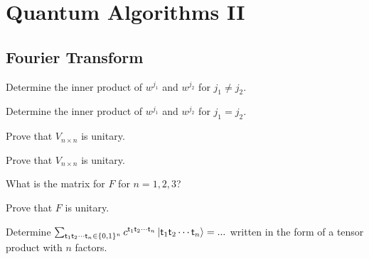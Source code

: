 
\chapter{Quantum Algorithms II}


\section{Fourier Transform}





\begin{example}
Determine the inner product of $w^{j_1}$ and $w^{j_2}$ for $j_1 \neq j_2$. 
\end{example}

\begin{example}
Determine the inner product of $w^{j_1}$ and $w^{j_2}$ for $j_1 = j_2$. 
\end{example}


\begin{example}
Prove that $V_{n \times n}$ is unitary.
\end{example}


\begin{example}
Prove that $V_{n \times n}$ is unitary.
\end{example}



\begin{example}
What is the matrix for $F$ for $n = 1,2,3$?
\end{example}

\begin{example}
Prove that $F$ is unitary.
\end{example}




\begin{example}
Determine $\sum_{\textsf{t}_1 \textsf{t}_2 \dotsm \textsf{t}_n \in \{0,1\}^n} 
c^{\textsf{t}_1 \textsf{t}_2 \dotsm \textsf{t}_n} 
\left|\textsf{t}_1 \textsf{t}_2 \dotsm \textsf{t}_n\right\rangle = ...$ 
written in the form of a tensor product with $n$ factors.
\end{example}

